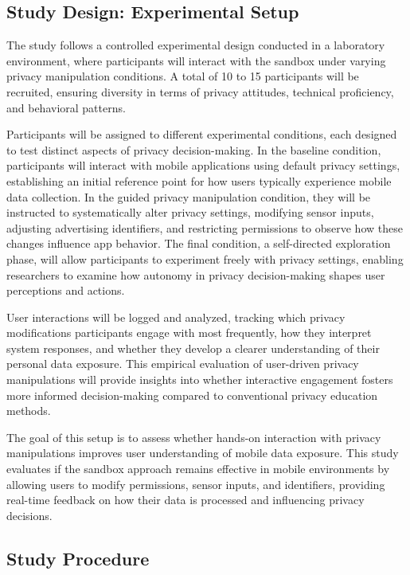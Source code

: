 \documentclass[acmlarge, nonacm]{acmart}
\begin{document}
\subsection{Study Design: Experimental Setup}

The study follows a controlled experimental design conducted in a laboratory environment, where participants will interact with the sandbox under varying privacy manipulation conditions. A total of 10 to 15 participants will be recruited, ensuring diversity in terms of privacy attitudes, technical proficiency, and behavioral patterns.

Participants will be assigned to different experimental conditions, each designed to test distinct aspects of privacy decision-making. In the baseline condition, participants will interact with mobile applications using default privacy settings, establishing an initial reference point for how users typically experience mobile data collection. In the guided privacy manipulation condition, they will be instructed to systematically alter privacy settings, modifying sensor inputs, adjusting advertising identifiers, and restricting permissions to observe how these changes influence app behavior. The final condition, a self-directed exploration phase, will allow participants to experiment freely with privacy settings, enabling researchers to examine how autonomy in privacy decision-making shapes user perceptions and actions.

User interactions will be logged and analyzed, tracking which privacy modifications participants engage with most frequently, how they interpret system responses, and whether they develop a clearer understanding of their personal data exposure. This empirical evaluation of user-driven privacy manipulations will provide insights into whether interactive engagement fosters more informed decision-making compared to conventional privacy education methods.

The goal of this setup is to assess whether hands-on interaction with privacy manipulations improves user understanding of mobile data exposure. This study evaluates if the sandbox approach remains effective in mobile environments by allowing users to modify permissions, sensor inputs, and identifiers, providing real-time feedback on how their data is processed and influencing privacy decisions.

\subsection{Study Procedure}
\end{document}
